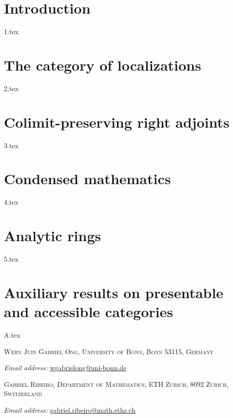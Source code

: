 \documentclass{scrartcl}
\begin{document}
\maketitle

\begin{abstract}
     \small{\textsc{Abstract.} We prove that certain categories of Bousfield localizations are presentable and give explicit regular cardinals $\kappa$ for which they are $\kappa$-presentable. As an application, we show that the category of analytic rings in the sense of Clausen and Scholze is $(2^{\aleph_0})^+$-presentable.}
\end{abstract}

\section{Introduction} 
{1.tex}

\section{The category of localizations}\label{sec2}
{2.tex}

\section{Colimit-preserving right adjoints}\label{sec3}
{3.tex}

\section{Condensed mathematics}
{4.tex}

\section{Analytic rings}
{5.tex}

\appendix
\section{Auxiliary results on presentable and accessible categories}
{A.tex}

\printbibliography

\textsc{Wern Juin Gabriel Ong, University of Bonn, Bonn 53115, Germany}

\textit{Email address:} \href{mailto:wgabrielong@uni-bonn.de}{wgabrielong@uni-bonn.de}

\medskip

\textsc{Gabriel Ribeiro, Department of Mathematics, ETH Zurich, 8092 Zurich, Switzerland}

\textit{Email address:} \href{mailto:gabriel.ribeiro@math.ethz.ch}{gabriel.ribeiro@math.ethz.ch}
\end{document}
